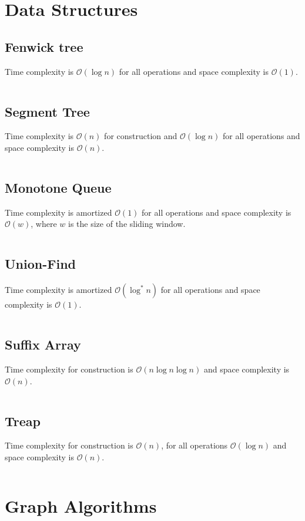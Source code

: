 \documentclass[8pt,a4paper,landscape,oneside]{amsart}
\newcommand{\code}[1]{\inputminted[fontsize=\normalsize,baselinestretch=1]{java}{code/#1}}
\newcommand{\bigO}{\mathcal{O}}
\begin{document}
\begin{multicols*}{3}
  
\section{Data Structures}
  \subsection{Fenwick tree}
  Time complexity is $\bigO(\log n)$ for all operations and space complexity is $\bigO(1)$.
  \code{Structures/Fenwick.java}
  
  \subsection{Segment Tree}
  Time complexity is $\bigO(n)$ for construction and $\bigO(\log n)$ for all operations and space complexity is $\bigO(n)$.
  \code{Structures/SegmentTreeRMQ.java}
  
  \subsection{Monotone Queue}
  Time complexity is amortized $\bigO(1)$ for all operations and space complexity is $\bigO(w)$, where $w$ is the size of the sliding window.
  \code{Structures/MinMonoQueue.java}
  
  \subsection{Union-Find}
  Time complexity is amortized $\bigO(\log^*{n})$ for all operations and space complexity is $\bigO(1)$.
  \code{Structures/UnionFind.java}
  
  \subsection{Suffix Array}
  Time complexity for construction is $\bigO(n\log{n}\log{n})$ and space complexity is $\bigO(n)$.
  \code{Structures/SuffixArray.java}
  
  \subsection{Treap}
  Time complexity for construction is $\bigO(n)$, for all operations $\bigO(\log{n})$ and space complexity is $\bigO(n)$.
  \code{Structures/Treap.java}
  
  
\section{Graph Algorithms}

\end{multicols*}
\end{document}
